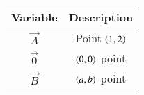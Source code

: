 \begin{tabular}[12pt]{ |c| c|}
    \hline
    \textbf{Variable} & \textbf{Description}\\ 
    \hline
	$\vec{A}$ & Point $\left(1,2\right)$\\
    \hline
	$\vec{0}$ & $\left(0,0\right)$ point\\
    \hline
	$\vec{B}$ & $\left(a,b\right)$ point\\
    \hline

    \end{tabular}

